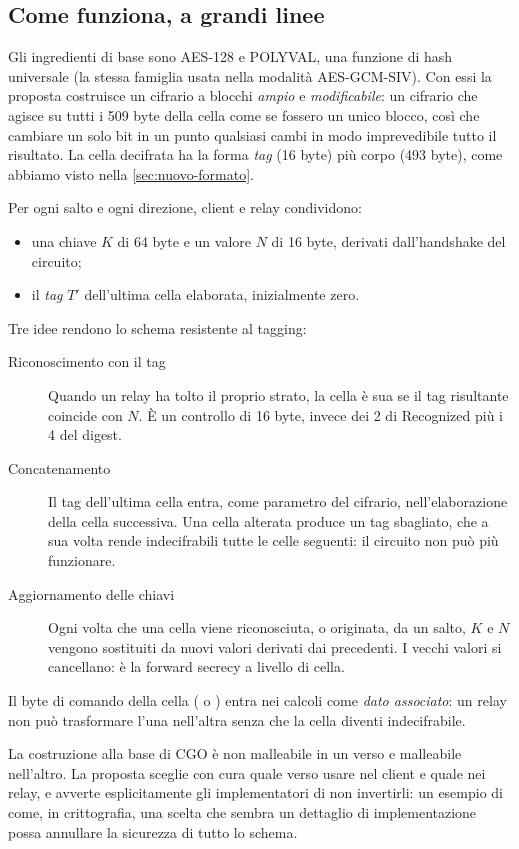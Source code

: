 \subsection{Come funziona, a grandi linee}

Gli ingredienti di base sono AES-128 e POLYVAL, una funzione di hash universale (la stessa famiglia usata nella modalità AES-GCM-SIV). Con essi la proposta costruisce un cifrario a blocchi \emph{ampio} e \emph{modificabile}: un cifrario che agisce su tutti i 509 byte della cella come se fossero un unico blocco, così che cambiare un solo bit in un punto qualsiasi cambi in modo imprevedibile tutto il risultato. La cella decifrata ha la forma \emph{tag} (16 byte) più corpo (493 byte), come abbiamo visto nella \cref{sec:nuovo-formato}.

Per ogni salto e ogni direzione, client e relay condividono:
\begin{itemize}
  \item una chiave $K$ di 64 byte e un valore $N$ di 16 byte, derivati dall'handshake del circuito;
  \item il \emph{tag} $T'$ dell'ultima cella elaborata, inizialmente zero.
\end{itemize}
Tre idee rendono lo schema resistente al tagging:
\begin{description}
  \item[Riconoscimento con il tag] Quando un relay ha tolto il proprio strato, la cella è sua se il tag risultante coincide con $N$. È un controllo di 16 byte, invece dei 2 di Recognized più i 4 del digest.
  \item[Concatenamento] Il tag dell'ultima cella entra, come parametro del cifrario, nell'elaborazione della cella successiva. Una cella alterata produce un tag sbagliato, che a sua volta rende indecifrabili tutte le celle seguenti: il circuito non può più funzionare.
  \item[Aggiornamento delle chiavi] Ogni volta che una cella viene riconosciuta, o originata, da un salto, $K$ e $N$ vengono sostituiti da nuovi valori derivati dai precedenti. I vecchi valori si cancellano: è la forward secrecy a livello di cella.
\end{description}
Il byte di comando della cella ( o ) entra nei calcoli come \emph{dato associato}: un relay non può trasformare l'una nell'altra senza che la cella diventi indecifrabile.

\begin{attenzione}
La costruzione alla base di CGO è non malleabile in un verso e malleabile nell'altro. La proposta sceglie con cura quale verso usare nel client e quale nei relay, e avverte esplicitamente gli implementatori di non invertirli: un esempio di come, in crittografia, una scelta che sembra un dettaglio di implementazione possa annullare la sicurezza di tutto lo schema.
\end{attenzione}

